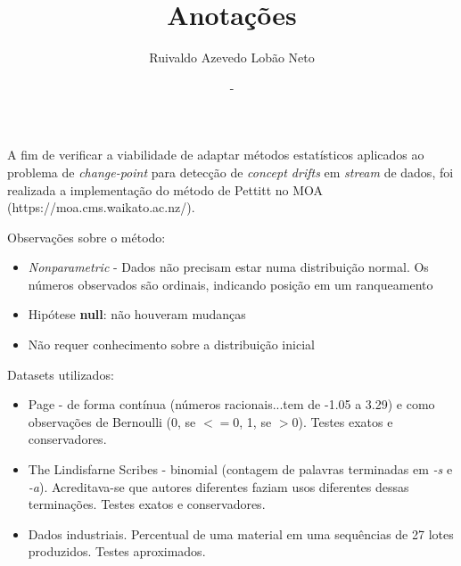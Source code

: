 \documentclass[qual, classic, a4paper]{ufbathesis}
\institute{Instituto de Matem\'{a}tica}
\title{Anotações}
\date{-}
\author{Ruivaldo Azevedo Lobão Neto}
\begin{document}








\mainmatter

% 
% 
% 
%



A fim de verificar a viabilidade de adaptar métodos estatísticos aplicados ao
problema de \textit{change-point} para detecção de \textit{concept drifts} em
\textit{stream} de dados, foi realizada a implementação do método de Pettitt
\cite{Pettitt} no MOA (https://moa.cms.waikato.ac.nz/).

Observações sobre o método:

\begin{itemize}
	\item \textit{Nonparametric} - Dados não precisam estar numa distribuição normal. Os números observados são ordinais, indicando posição em um ranqueamento
	\item Hipótese \textbf{null}: não houveram mudanças
	\item Não requer conhecimento sobre a distribuição inicial
\end{itemize}

Datasets utilizados:

\begin{itemize}
	\item Page \cite{Page} - de forma contínua (números racionais...tem de -1.05 a 3.29) e como
	      observações de Bernoulli (0, se $<= 0$, 1, se $> 0$). Testes exatos e conservadores.

	\item The Lindisfarne Scribes - binomial (contagem de palavras terminadas em \textit{-s} e \textit{-a}). Acreditava-se que autores diferentes faziam usos diferentes dessas terminações. Testes exatos e conservadores.

	\item Dados industriais. Percentual de uma material em uma sequências de 27 lotes produzidos. Testes aproximados.
\end{itemize}
\end{document}
